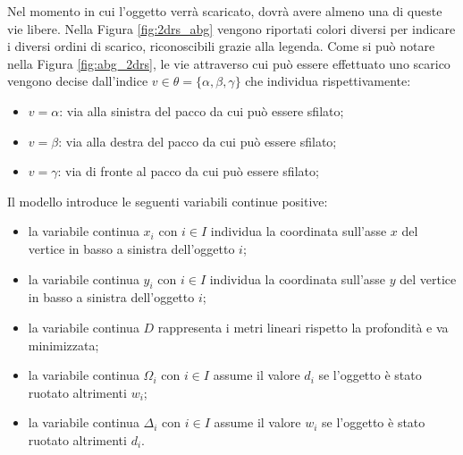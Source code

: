 Nel momento in cui l'oggetto verrà scaricato, dovrà avere almeno una di queste vie libere.
Nella Figura \ref{fig:2drs_abg} vengono riportati colori diversi per indicare i diversi ordini di scarico, riconoscibili grazie alla legenda.
Come si può notare nella Figura \ref{fig:abg_2drs}, le vie attraverso cui può essere effettuato uno scarico vengono decise dall'indice $v \in \theta = \{\alpha,\beta,\gamma\}$ che individua rispettivamente:
\begin{itemize}
	\item $v = \alpha$: via alla sinistra del pacco da cui può essere sfilato; 
	\item $v = \beta$: via alla destra del pacco da cui può essere sfilato; 
	\item $v = \gamma$: via di fronte al pacco da cui può essere sfilato; 
\end{itemize}

Il modello introduce le seguenti variabili continue positive:
\begin{itemize}
	\item la variabile continua $x_{i}$ con $i \in I$ individua la coordinata sull'asse $x$ del vertice in basso a sinistra dell'oggetto $i$;
	\item la variabile continua $y_{i}$ con $i \in I$ individua la coordinata sull'asse $y$ del vertice in basso a sinistra dell'oggetto $i$;
	\item la variabile continua $D$ rappresenta i metri lineari rispetto la profondità e va minimizzata;
	\item la variabile continua $\Omega_{i}$ con $i \in I$ assume il valore $d_i$ se l'oggetto è stato ruotato altrimenti $w_i$;
	\item la variabile continua $\Delta_{i}$ con $i \in I$ assume il valore $w_i$ se l'oggetto è stato ruotato altrimenti $d_i$.
\end{itemize}

